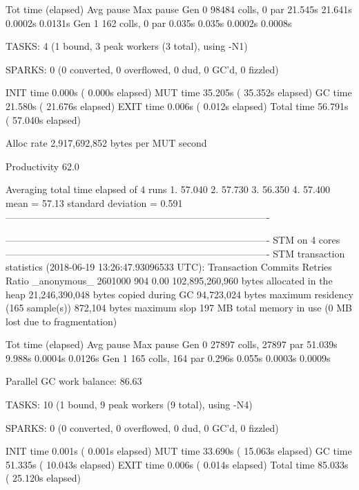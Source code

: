                                      Tot time (elapsed)  Avg pause  Max pause
  Gen  0     98484 colls,     0 par   21.545s  21.641s     0.0002s    0.0131s
  Gen  1       162 colls,     0 par    0.035s   0.035s     0.0002s    0.0008s

  TASKS: 4 (1 bound, 3 peak workers (3 total), using -N1)

  SPARKS: 0 (0 converted, 0 overflowed, 0 dud, 0 GC'd, 0 fizzled)

  INIT    time    0.000s  (  0.000s elapsed)
  MUT     time   35.205s  ( 35.352s elapsed)
  GC      time   21.580s  ( 21.676s elapsed)
  EXIT    time    0.006s  (  0.012s elapsed)
  Total   time   56.791s  ( 57.040s elapsed)

  Alloc rate    2,917,692,852 bytes per MUT second

  Productivity  62.0%
  
Averaging total time elapsed of 4 runs 
1. 57.040
2. 57.730
3. 56.350
4. 57.400
mean = 57.13
standard deviation = 0.591
----------------------------------------------------------------------------------


----------------------------------------------------------------------------------
STM on 4 cores
----------------------------------------------------------------------------------
STM transaction statistics (2018-06-19 13:26:47.93096533 UTC):
Transaction     Commits    Retries      Ratio
_anonymous_     2601000        904       0.00
 102,895,260,960 bytes allocated in the heap
  21,246,390,048 bytes copied during GC
      94,723,024 bytes maximum residency (165 sample(s))
         872,104 bytes maximum slop
             197 MB total memory in use (0 MB lost due to fragmentation)

                                     Tot time (elapsed)  Avg pause  Max pause
  Gen  0     27897 colls, 27897 par   51.039s   9.988s     0.0004s    0.0126s
  Gen  1       165 colls,   164 par    0.296s   0.055s     0.0003s    0.0009s

  Parallel GC work balance: 86.63%

  TASKS: 10 (1 bound, 9 peak workers (9 total), using -N4)

  SPARKS: 0 (0 converted, 0 overflowed, 0 dud, 0 GC'd, 0 fizzled)

  INIT    time    0.001s  (  0.001s elapsed)
  MUT     time   33.690s  ( 15.063s elapsed)
  GC      time   51.335s  ( 10.043s elapsed)
  EXIT    time    0.006s  (  0.014s elapsed)
  Total   time   85.033s  ( 25.120s elapsed)

